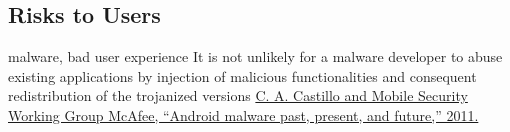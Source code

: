 \subsection{Risks to Users} \label{subsection:foundation-piracy-users}
malware, bad user experience\newline
It is not unlikely for a malware developer to abuse existing applications by injection of malicious functionalities and consequent redistribution of the trojanized versions \url{C. A. Castillo and Mobile Security Working Group McAfee, “Android malware past, present, and future,” 2011.}
